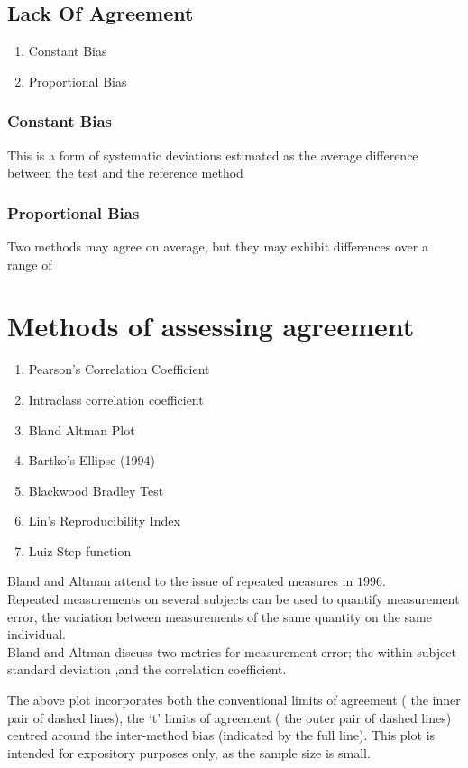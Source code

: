 \documentclass[12pt, a4paper]{report}
\theoremstyle{plain}
\theoremstyle{definition}
\theoremstyle{remark}
\begin{document}
	\subsection{Lack Of Agreement}
	\begin{enumerate}
		\item Constant Bias\item Proportional Bias
	\end{enumerate}
	
	\subsubsection*{Constant Bias} This is a form of systematic
	deviations estimated as the average difference between the test
	and the reference method
	
	
	\subsubsection*{Proportional Bias} Two methods may agree on
	average, but they may exhibit differences over a range of
	\section{Methods of assessing agreement}
	
	\begin{enumerate}
		\item Pearson's Correlation Coefficient\item Intraclass
		correlation coefficient \item Bland Altman Plot \item Bartko's
		Ellipse (1994) \item Blackwood Bradley Test \item Lin's
		Reproducibility Index \item Luiz Step function
	\end{enumerate}
	
	Bland and Altman attend to the issue of repeated measures in
	$1996$.
	\\
	Repeated measurements on several subjects can be used to quantify
	measurement error, the variation between measurements of the same
	quantity on the same individual.
	\\
	Bland and Altman discuss two metrics for measurement error; the
	within-subject standard deviation ,and the correlation
	coefficient.
	
	The above plot incorporates both the conventional limits of
	agreement ( the inner pair of dashed lines), the `t' limits of
	agreement ( the outer pair of dashed lines) centred around the
	inter-method bias (indicated by the full line). This plot is
	intended for expository purposes only, as the sample size is
	small.
	
\end{document}
